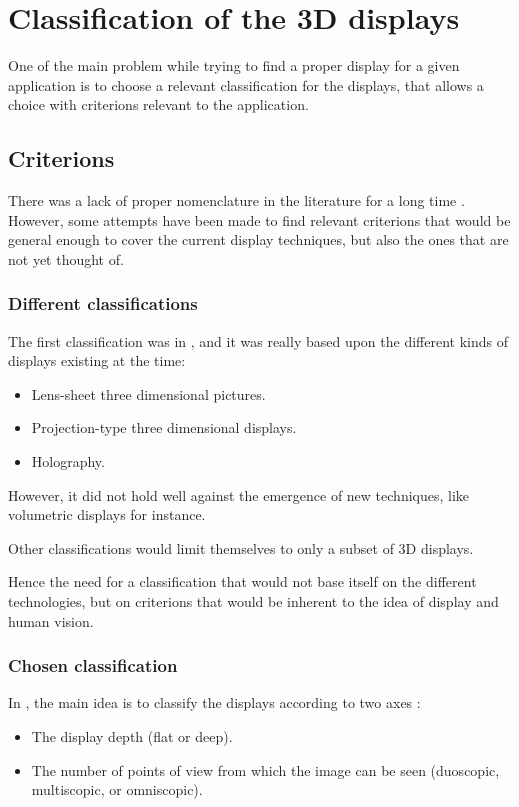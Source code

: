 \section{Classification of the 3D displays}
One of the main problem while trying to find a proper \gls{display} for a given application is to choose a relevant classification for the displays, that allows a choice with criterions relevant to the application.
\subsection{Criterions}
There was a lack of proper nomenclature in the literature for a long time \cite{pimenta2012comprehensive}. However, some attempts have been made to find relevant criterions that would be general enough to cover the current display techniques, but also the ones that are not yet thought of.

\subsubsection{Different classifications}
The first classification was in \cite{okoshi1976three}, and it was really based upon the different kinds of displays existing at the time: 
\begin{itemize}
\item Lens-sheet three dimensional pictures.
\item Projection-type three dimensional displays.
\item Holography.
\end{itemize}

However, it did not hold well against the emergence of new techniques, like volumetric displays for instance.

Other classifications %
would limit themselves to only a subset of 3D displays.

Hence the need for a classification that would not base itself on the different technologies, but on criterions that would be inherent to the idea of display and human vision.

\subsubsection{Chosen classification}
In \cite{pimenta2012comprehensive}, the main idea is to classify the displays according to two axes : 

\begin{itemize}
\item The display depth (flat or deep).
\item The number of points of view from which the image can be seen (duoscopic, multiscopic, or omniscopic).
\end{itemize}

